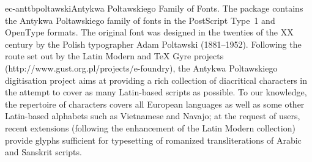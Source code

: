 \documentclass{ddltxtyp}
\begin{document}
\begin{package}{ec-anttb}{poltawski}{Antykwa Poltawskiego Family of Fonts.}
The package contains the Antykwa Poltawskiego family of fonts
in the PostScript Type~1 and OpenType formats. The original
font was designed in the twenties of the XX century by the
Polish typographer Adam Poltawski (1881--1952). Following the
route set out by the Latin Modern and {\TeX} Gyre projects
(http://www.gust.org.pl/projects/e-foundry), the Antykwa
Poltawskiego digitisation project aims at providing a rich
collection of diacritical characters in the attempt to cover as
many Latin-based scripts as possible. To our knowledge, the
repertoire of characters covers all European languages as well
as some other Latin-based alphabets such as Vietnamese and
Navajo; at the request of users, recent extensions (following
the enhancement of the Latin Modern collection) provide glyphs
sufficient for typesetting of romanized transliterations of
Arabic and Sanskrit scripts. %
\end{package}
\end{document}
